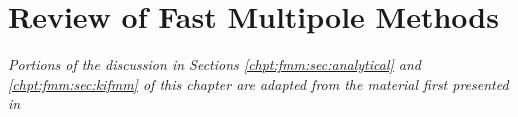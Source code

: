 
\chapter{Review of Fast Multipole Methods}\label{chpt:fmm}
\thispagestyle{chaptertitle} %

\begin{center}
    \textit{Portions of the discussion in Sections \ref{chpt:fmm:sec:analytical} and \ref{chpt:fmm:sec:kifmm} of this chapter are adapted from the material first presented in \cite{kailasa2024m2ltranslationoperatorskernel} }
\end{center}










